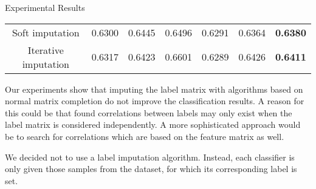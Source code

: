 \begin{subsection}{Experimental Results}
\begin{center}
\begin{tabular}{ |c||c|c|c|c|c|c|  }
			Soft imputation&0.6300&0.6445&0.6496&0.6291&0.6364&\textbf{0.6380}\\
			Iterative imputation&0.6317&0.6423&0.6601&0.6289&0.6426&\textbf{0.6411}\\
			\hline
		\end{tabular}
	\end{center}
	Our experiments show that imputing the label matrix with algorithms based on normal matrix completion do not improve the classification results. A reason for this could be that found correlations between labels may only exist when the label matrix is considered independently. A more sophisticated approach would be to search for correlations which are based on the feature matrix as well. \par
	We decided not to use a label imputation algorithm. Instead, each classifier is only given those samples from the dataset, for which its corresponding label is set.
\end{subsection}